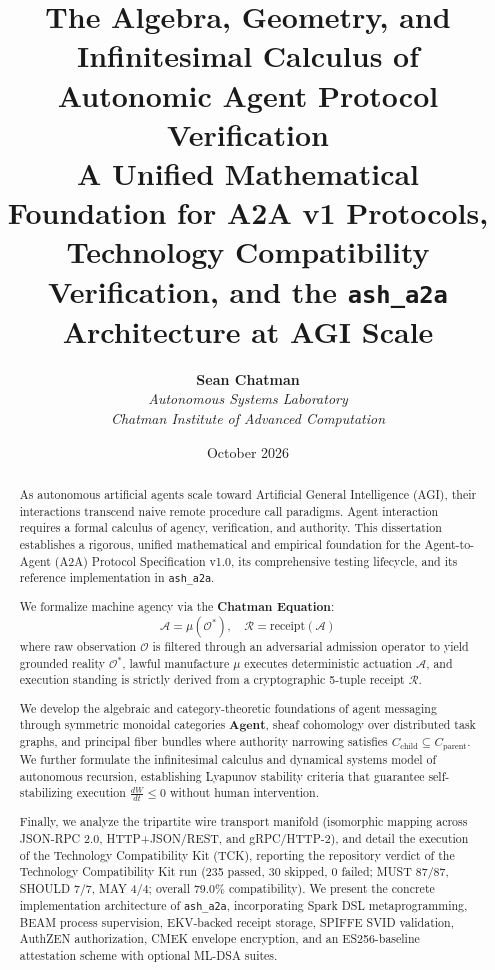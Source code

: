 \documentclass[11pt,twoside,openright]{report}
\title{\textbf{\LARGE The Algebra, Geometry, and Infinitesimal Calculus of Autonomic Agent Protocol Verification}\\
\vspace{0.5em}
\Large A Unified Mathematical Foundation for A2A v1 Protocols, Technology Compatibility Verification, and the \texttt{ash\_a2a} Architecture at AGI Scale}
\author{\textbf{Sean Chatman} \\
\textit{Autonomous Systems Laboratory} \\
\textit{Chatman Institute of Advanced Computation}}
\date{October 2026}
\theoremstyle{definition}
\theoremstyle{plain}
\theoremstyle{remark}
\newcommand{\CatAgent}{\mathbf{Agent}}
\begin{document}
\maketitle

\begin{abstract}
As autonomous artificial agents scale toward Artificial General Intelligence (AGI), their interactions transcend naive remote procedure call paradigms. Agent interaction requires a formal calculus of agency, verification, and authority. This dissertation establishes a rigorous, unified mathematical and empirical foundation for the Agent-to-Agent (A2A) Protocol Specification v1.0, its comprehensive testing lifecycle, and its reference implementation in \texttt{ash\_a2a}.

We formalize machine agency via the \textbf{Chatman Equation}:
\[
\mathcal{A} = \mu(\mathcal{O}^*), \quad \mathcal{R} = \mathrm{receipt}(\mathcal{A})
\]
where raw observation $\mathcal{O}$ is filtered through an adversarial admission operator to yield grounded reality $\mathcal{O}^*$, lawful manufacture $\mu$ executes deterministic actuation $\mathcal{A}$, and execution standing is strictly derived from a cryptographic 5-tuple receipt $\mathcal{R}$. 

We develop the algebraic and category-theoretic foundations of agent messaging through symmetric monoidal categories $\CatAgent$, sheaf cohomology over distributed task graphs, and principal fiber bundles where authority narrowing satisfies $C_{\mathrm{child}} \subseteq C_{\mathrm{parent}}$. We further formulate the infinitesimal calculus and dynamical systems model of autonomous recursion, establishing Lyapunov stability criteria that guarantee self-stabilizing execution $\frac{dW}{dt} \le 0$ without human intervention.

Finally, we analyze the tripartite wire transport manifold (isomorphic mapping across JSON-RPC 2.0, HTTP+JSON/REST, and gRPC/HTTP-2), and detail the execution of the Technology Compatibility Kit (TCK), reporting the repository verdict of the Technology Compatibility Kit run (235 passed, 30 skipped, 0 failed; MUST 87/87, SHOULD 7/7, MAY 4/4; overall 79.0\% compatibility). We present the concrete implementation architecture of \texttt{ash\_a2a}, incorporating Spark DSL metaprogramming, BEAM process supervision, EKV-backed receipt storage, SPIFFE SVID validation, AuthZEN authorization, CMEK envelope encryption, and an ES256-baseline attestation scheme with optional ML-DSA suites.
\end{abstract}
\end{document}
